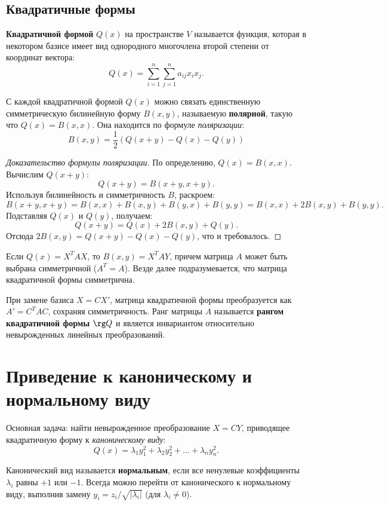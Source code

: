 \documentclass[12pt]{article}
\begin{document}
\subsection{Квадратичные формы}
\begin{definition}
\textbf{Квадратичной формой} $Q(x)$ на пространстве $V$ называется функция, которая в некотором базисе имеет вид однородного многочлена второй степени от координат вектора:
\[
Q(x) = \sum_{i=1}^n \sum_{j=1}^n a_{ij} x_i x_j.
\]
\end{definition}

С каждой квадратичной формой $Q(x)$ можно связать единственную симметрическую билинейную форму $B(x,y)$, называемую \textbf{полярной}, такую что $Q(x) = B(x,x)$. Она находится по формуле \textit{поляризации}:
\[
\boxed{B(x, y) = \frac{1}{2}(Q(x+y) - Q(x) - Q(y))}
\]

\begin{proof}[Доказательство формулы поляризации]
По определению, $Q(x) = B(x,x)$. Вычислим $Q(x+y)$:
\[
Q(x+y) = B(x+y, x+y).
\]
Используя билинейность и симметричность $B$, раскроем:
\[
B(x+y, x+y) = B(x,x) + B(x,y) + B(y,x) + B(y,y) = B(x,x) + 2B(x,y) + B(y,y).
\]
Подставляя $Q(x)$ и $Q(y)$, получаем:
\[
Q(x+y) = Q(x) + 2B(x,y) + Q(y).
\]
Отсюда $2B(x,y) = Q(x+y) - Q(x) - Q(y)$, что и требовалось.
\end{proof}

Если $Q(x) = X^T A X$, то $B(x,y) = X^T A Y$, причем матрица $A$ может быть выбрана симметричной ($A^T = A$). Везде далее подразумевается, что матрица квадратичной формы симметрична.

\begin{remark}
При замене базиса $X = C X'$, матрица квадратичной формы преобразуется как $A' = C^T A C$, сохраняя симметричность. Ранг матрицы $A$ называется \textbf{рангом квадратичной формы} $\rg Q$ и является инвариантом относительно невырожденных линейных преобразований.
\end{remark}

\section{Приведение к каноническому и нормальному виду}
Основная задача: найти невырожденное преобразование $X = CY$, приводящее квадратичную форму к \textit{каноническому виду}:
\[
Q(x) = \lambda_1 y_1^2 + \lambda_2 y_2^2 + \dots + \lambda_n y_n^2.
\]

\begin{definition}
Канонический вид называется \textbf{нормальным}, если все ненулевые коэффициенты $\lambda_i$ равны $+1$ или $-1$. Всегда можно перейти от канонического к нормальному виду, выполнив замену $y_i = z_i / \sqrt{|\lambda_i|}$ (для $\lambda_i \neq 0$).
\end{definition}
\end{document}
